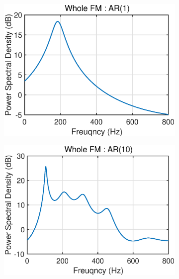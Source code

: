 \begin{figure}[htb]
     \centering
     \hspace{-0.4cm}
     \begin{subfigure}[b]{0.33\textwidth}
         \centering
         \includegraphics[width=\textwidth]{fig/32/32a2.eps}
     \end{subfigure}
    \hspace{-0.4cm}
     \begin{subfigure}[b]{0.33\textwidth}
         \centering
         \includegraphics[width=\textwidth]{fig/32/32a3.eps}
     \end{subfigure}
    \hspace{-0.4cm}

\end{figure}
